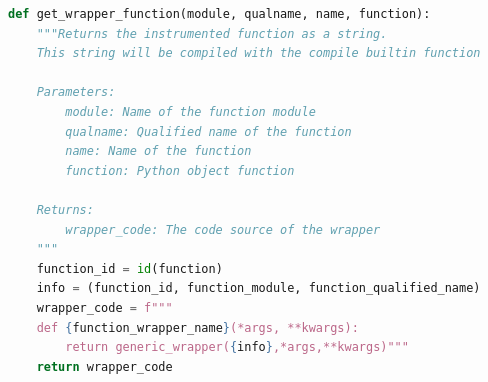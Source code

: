 \documentclass[11pt]{article}
\newcommand{\tristan}[1]{\color{orange}\textbf{From Tristan:} #1\color{black}\xspace}
\newcommand{\pytracer}[0]{PyTracer\xspace}
\begin{document}
%




\begin{listing}
    \centering
\begin{lstlisting}[language=Python,style=customPython]
def get_wrapper_function(module, qualname, name, function):
    """Returns the instrumented function as a string.
    This string will be compiled with the compile builtin function
    
    Parameters:
        module: Name of the function module
        qualname: Qualified name of the function
        name: Name of the function
        function: Python object function
        
    Returns:
        wrapper_code: The code source of the wrapper
    """
    function_id = id(function)
    info = (function_id, function_module, function_qualified_name)
    wrapper_code = f"""
    def {function_wrapper_name}(*args, **kwargs):
        return generic_wrapper({info},*args,**kwargs)"""
    return wrapper_code
\end{lstlisting}
    \caption{Function to create the instrumented version of a function.
    \pytracer uses the identifier of the function instead of the 
    actual function to get rid of aliases and duplicated instrumentations.}
    \label{fig:wrapper_creation}
\end{listing}
\end{document}
